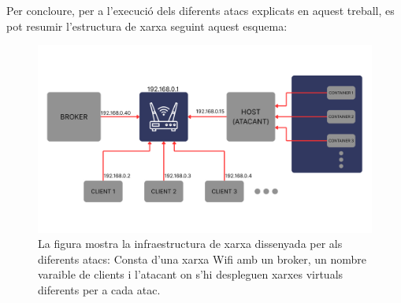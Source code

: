 Per concloure, per a l'execució dels diferents atacs explicats en aquest treball, es pot resumir l'estructura de xarxa seguint aquest esquema:

 \begin{figure}[H]
    \centering
    \includegraphics[width=1\textwidth]{img/infraXarxa.png}
    \caption{La figura mostra la infraestructura de xarxa dissenyada per als diferents atacs: Consta d'una xarxa Wifi amb un broker, un nombre varaible de clients i l'atacant on s'hi despleguen xarxes virtuals diferents per a cada atac.}
    \label{fig:Infraestructura}
  \end{figure}
